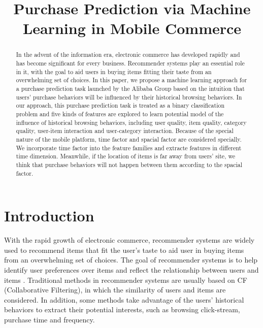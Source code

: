 \documentclass{llncs}
\begin{document}
%
\title{Purchase Prediction via Machine Learning in Mobile Commerce}
%
\maketitle
%
\begin{abstract}
In the advent of the information era, electronic commerce has
developed rapidly and has become significant for every business.
Recommender systems play an essential role in it,
with the goal to aid users in buying items
fitting their taste from an overwhelming set of choices.
In this paper, we propose a machine learning approach
for a purchase prediction task launched by the Alibaba Group
based on the intuition that users' purchase behaviors
will be influenced by their historical browsing behaviors.
In our approach, this purchase prediction task is treated as
a binary classification problem
and five kinds of features are explored to learn potential model
of the influence of historical browsing behaviors,
including user quality, item quality, category quality,
user-item interaction and user-category interaction.
Because of the special nature of the mobile platform,
time factor and spacial factor are considered specially.
We incorporate time factor into the feature families
and extracte features in different time dimension.
Meanwhile, if the location of items is far away from users' site,
we think that purchase behaviors will not happen between them
according to the spacial factor.
\end{abstract}
%
\section{Introduction}
With the rapid growth of electronic commerce,
recommender systems are widely used to recommend items that fit the user's taste
to aid user in buying items from an overwhelming set of choices.
The goal of recommender systems is to help identify user preferences over items and
reflect the relationship between users and items \cite{lu2012recommender}.
Traditional methods in recommender systems are usually based on
CF (Collaborative Filtering),
in which the similarity of users and items are considered.
In addition, some methods take advantage of the users' historical behaviors
to extract their potential interests,
such as browsing click-stream, purchase time and frequency.
\end{document}
